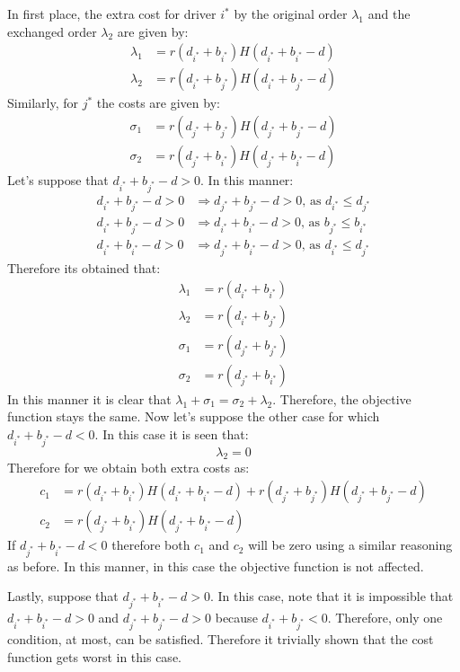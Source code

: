 \documentclass[11pt]{article}
\theoremstyle{definition}
\theoremstyle{remark}
\theoremstyle{remark}
\begin{document}
In first place, the extra cost for driver $i^{*}$ by the original
order $\lambda_{1}$ and the exchanged order $\lambda_{2}$ are given by:
%
\begin{align*}
  \lambda_1 &= r(d_{i^*} + b_{i^*})H(d_{i^*} + b_{i^*} - d) \\
  \lambda_2 &= r(d_{i^*} + b_{j^*})H(d_{i^*} + b_{j^*} - d)
\end{align*}
%
Similarly, for $j^{*}$ the costs are given by:
%
\begin{align*}
  \sigma_1 &= r(d_{j^*} + b_{j^*})H(d_{j^*} + b_{j^*} - d) \\
  \sigma_2 &= r(d_{j^*} + b_{i^*})H(d_{j^*} + b_{i^*} - d)
\end{align*}
%
Let's suppose that $d_{i^{*}} + b_{j^{*}} - d > 0$. In this manner:
%
\begin{align*}
  d_{i^{*}} + b_{j^{*}} - d > 0 &\Rightarrow d_{j^*} + b_{j^*} - d > 0
                                  \text{, as } d_{i^*} \le d_{j^*} \\
  d_{i^{*}} + b_{j^{*}} - d > 0 &\Rightarrow d_{i^*} + b_{i^*} - d > 0
                                  \text{, as } b_{j^*} \le b_{i^*} \\
  d_{i^*} + b_{i^*} - d > 0 &\Rightarrow d_{j^*} + b_{i^*} - d > 0
                              \text{, as } d_{i^*} \le d_{j^*}
\end{align*}
%
Therefore its obtained that:
%
\begin{align*}
  \lambda_1 &= r(d_{i^*} + b_{i^*}) \\
  \lambda_2 &= r(d_{i^*} + b_{j^*}) \\
  \sigma_1 &= r(d_{j^*} + b_{j^*}) \\
  \sigma_2 &= r(d_{j^*} + b_{i^*})
\end{align*}
%
In this manner it is clear that
$\lambda_{1} + \sigma_{1} = \sigma_{2} + \lambda_{2}$. Therefore, the objective
function stays the same. Now let's suppose the other case for which
$d_{i^{*}} + b_{j^{*}} - d < 0$. In this case it is seen that:
%
\begin{equation*}
  \lambda_2 = 0
\end{equation*}
%
Therefore for we obtain both extra costs as:
%
\begin{align*}
  c_1 &= r(d_{i^*} + b_{i^*})H(d_{i^*} + b_{i^*} - d) +
         r(d_{j^*} + b_{j^*})H(d_{j^*} + b_{j^*} - d) \\
  c_2 &= r(d_{j^*} + b_{i^*})H(d_{j^*} + b_{i^*} - d)
\end{align*}
%
If $d_{j^{*}} + b_{i^{*}} - d < 0$ therefore both $c_{1}$ and $c_{2}$ will be
zero using a similar reasoning as before. In this manner, in this case the
objective function is not affected.

Lastly, suppose that $d_{j^{*}} + b_{i^{*}} - d > 0$. In this case, note that it
is impossible that $d_{i^{*}} + b_{i^{*}} - d > 0$ and
$d_{j^{*}} + b_{j^{*}} - d > 0$ because $d_{i^{*}} + b_{j^{*}} < 0$. Therefore,
only one condition, at most, can be satisfied. Therefore it trivially shown that
the cost function gets worst in this case.
\end{document}
